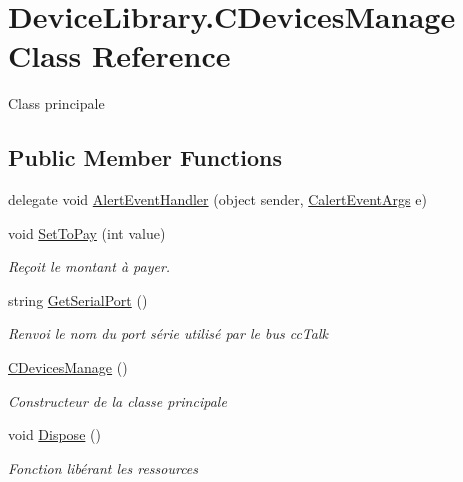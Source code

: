 \hypertarget{class_device_library_1_1_c_devices_manage}{}\section{Device\+Library.\+C\+Devices\+Manage Class Reference}
\label{class_device_library_1_1_c_devices_manage}


Class principale  


\subsection*{Public Member Functions}
\begin{DoxyCompactItemize}
\item 
delegate void \mbox{\hyperlink{class_device_library_1_1_c_devices_manage_a76f84b8a18500338f67d33123aa3332a}{Alert\+Event\+Handler}} (object sender, \mbox{\hyperlink{class_device_library_1_1_calert_event_args}{Calert\+Event\+Args}} e)
\item 
void \mbox{\hyperlink{class_device_library_1_1_c_devices_manage_aa97972b2301cbe60090f74e7276c2c52}{Set\+To\+Pay}} (int value)
\begin{DoxyCompactList}\small\item\em Reçoit le montant à payer. \end{DoxyCompactList}\item 
string \mbox{\hyperlink{class_device_library_1_1_c_devices_manage_a6b10aa601256c13d54c8c4642b029e10}{Get\+Serial\+Port}} ()
\begin{DoxyCompactList}\small\item\em Renvoi le nom du port série utilisé par le bus cc\+Talk \end{DoxyCompactList}\item 
\mbox{\hyperlink{class_device_library_1_1_c_devices_manage_a56177d99576c5d63e3233458a2a70ae1}{C\+Devices\+Manage}} ()
\begin{DoxyCompactList}\small\item\em Constructeur de la classe principale \end{DoxyCompactList}\item 
void \mbox{\hyperlink{class_device_library_1_1_c_devices_manage_a369960a1c585a85b637c7c217f927e1f}{Dispose}} ()
\begin{DoxyCompactList}\small\item\em Fonction libérant les ressources \end{DoxyCompactList}\end{DoxyCompactItemize}
